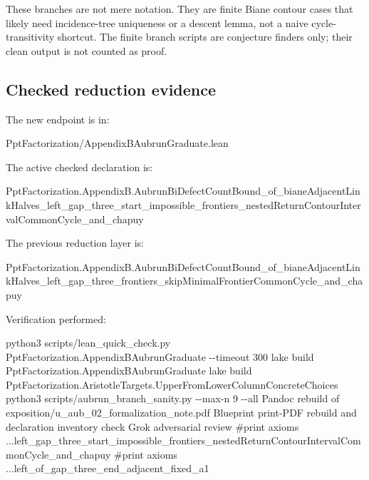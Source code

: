 \documentclass[
]{article}
\newenvironment{Shaded}{}{}
\newcommand{\NormalTok}[1]{#1}
\begin{document}
These branches are not mere notation. They are finite Biane contour
cases that likely need incidence-tree uniqueness or a descent lemma, not
a naive cycle-transitivity shortcut. The finite branch scripts are
conjecture finders only; their clean output is not counted as proof.

\subsection{Checked reduction
evidence}\label{checked-reduction-evidence}

The new endpoint is in:

\begin{Shaded}
\begin{Highlighting}[]
\NormalTok{PptFactorization/AppendixBAubrunGraduate.lean}
\end{Highlighting}
\end{Shaded}

The active checked declaration is:

\begin{Shaded}
\begin{Highlighting}[]
\NormalTok{PptFactorization.AppendixB.AubrunBiDefectCountBound\_of\_bianeAdjacentLinkHalves\_left\_gap\_three\_start\_impossible\_frontiers\_nestedReturnContourIntervalCommonCycle\_and\_chapuy}
\end{Highlighting}
\end{Shaded}

The previous reduction layer is:

\begin{Shaded}
\begin{Highlighting}[]
\NormalTok{PptFactorization.AppendixB.AubrunBiDefectCountBound\_of\_bianeAdjacentLinkHalves\_left\_gap\_three\_frontiers\_skipMinimalFrontierCommonCycle\_and\_chapuy}
\end{Highlighting}
\end{Shaded}

Verification performed:

\begin{Shaded}
\begin{Highlighting}[]
\NormalTok{python3 scripts/lean\_quick\_check.py PptFactorization.AppendixBAubrunGraduate {-}{-}timeout 300}
\NormalTok{lake build PptFactorization.AppendixBAubrunGraduate}
\NormalTok{lake build PptFactorization.AristotleTargets.UpperFromLowerColumnConcreteChoices}
\NormalTok{python3 scripts/aubrun\_branch\_sanity.py {-}{-}max{-}n 9 {-}{-}all}
\NormalTok{Pandoc rebuild of exposition/u\_aub\_02\_formalization\_note.pdf}
\NormalTok{Blueprint print{-}PDF rebuild and declaration inventory check}
\NormalTok{Grok adversarial review}
\NormalTok{\#print axioms ...left\_gap\_three\_start\_impossible\_frontiers\_nestedReturnContourIntervalCommonCycle\_and\_chapuy}
\NormalTok{\#print axioms ...left\_of\_gap\_three\_end\_adjacent\_fixed\_a1}
\end{Highlighting}
\end{Shaded}
\end{document}
